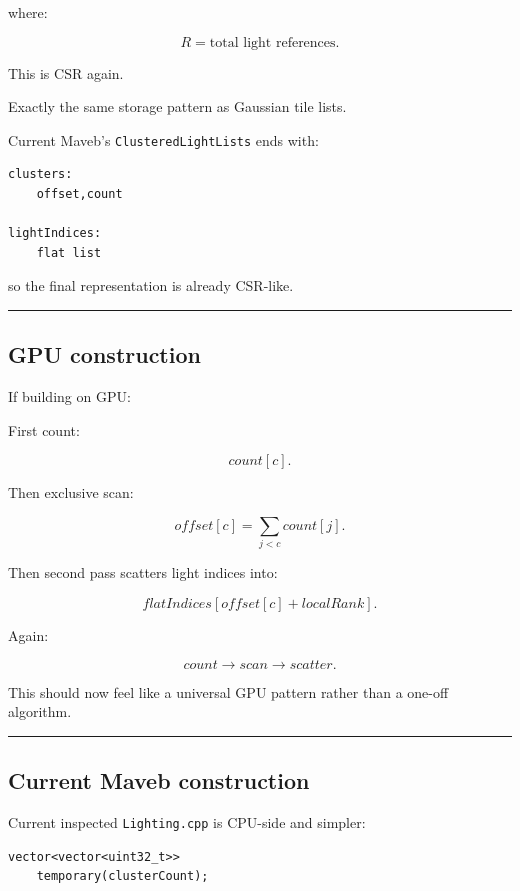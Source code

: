 where:

\[
R=
\text{total light references}.
\]

This is CSR again.

Exactly the same storage pattern as Gaussian tile lists.

Current Maveb's \texttt{ClusteredLightLists} ends with:

\begin{verbatim}
clusters:
    offset,count

lightIndices:
    flat list
\end{verbatim}

so the final representation is already CSR-like.

\begin{center}\rule{0.5\linewidth}{0.5pt}\end{center}

\subsection{GPU construction}\label{04-visual-computing-ii-ch040-gpu-construction}

If building on GPU:

First count:

\[
count[c].
\]

Then exclusive scan:

\[
offset[c]
=
\sum_{j<c}count[j].
\]

Then second pass scatters light indices into:

\[
flatIndices[
offset[c]+localRank
].
\]

Again:

\[
\boxed{
count
\rightarrow
scan
\rightarrow
scatter.
}
\]

This should now feel like a universal GPU pattern rather than a one-off algorithm.

\begin{center}\rule{0.5\linewidth}{0.5pt}\end{center}

\subsection{Current Maveb construction}\label{04-visual-computing-ii-ch040-current-maveb-construction}

Current inspected \texttt{Lighting.cpp} is CPU-side and simpler:

\begin{verbatim}
vector<vector<uint32_t>>
    temporary(clusterCount);
\end{verbatim}

